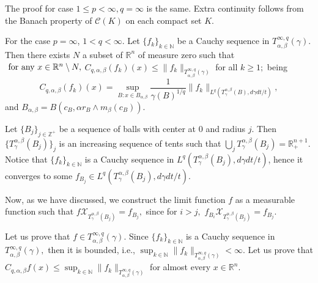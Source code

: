 \documentclass[leqno,11pt]{amsart}
\theoremstyle{plain}
\theoremstyle{remark}
\begin{document}
{{{The proof for case $1\le p <\infty, q=\infty$ is the same. Extra continuity follows from the Banach property of $\mathscr{C}(K)$ on each compact set $K$.

 For the case $p=\infty$, $1< q <\infty.$ Let $\{f_k\}_{k\in {\mathbb N}}$ be a Cauchy sequence in $T^{\infty, q}_{\alpha, \beta}(\gamma).$ Then there exists $N$ a subset of $\mathbb{R}^n$ of measure zero such that $\hbox{ for any } x\in \mathbb{R}^n\setminus N,$
$C_{q,\alpha, \beta}(f_k)(x)\le \|f_k\|_{T^{\infty, q}_{\alpha, \beta}(\gamma)}$ for all $k\ge 1;$ being $$C_{q,\alpha, \beta}(f_k)(x)=\sup_{B: x\in B_{\alpha, \beta}}\frac{1}{\gamma(B)^{1/q}}\|f_k\|_{L^q(T^{\alpha, \beta}_\gamma(B),d\gamma dt/t)},$$ and $B_{\alpha, \beta}=B(c_B, \alpha r_B\wedge m_\beta (c_B)).$

Let $\{B_j\}_{j\in {\mathbb Z}^+}$ be a sequence of balls with center at $0$ and radius $j.$ Then $\{T^{\alpha,\beta}_\gamma(B_j)\}_j$ is an increasing sequence of tents such that $\bigcup_j T^{\alpha,\beta}_\gamma(B_j)=\mathbb{R}^{n+1}_+.$ Notice that $\{f_k\}_{k\in {\mathbb N}}$ is a Cauchy sequence in $L^q\left(T^{\alpha, \beta}_\gamma(B_j), d\gamma dt/t\right)$, hence it converges to some $f_{B_j} \in L^q\left(T^{\alpha, \beta}_\gamma(B_j), d\gamma dt/t\right)$.  

Now, as we have discussed, we construct the limit function $f$ as a measurable function such that $f\mathcal{X}_{T^{\alpha,\beta}_\gamma (B_j)}=f_{B_j},$ since for $i>j,$ $f_{B_i}\mathcal{X}_{T^{\alpha,\beta}_\gamma(B_j)}=f_{B_j}.$


 
Let us prove that $f\in T_{\alpha, \beta}^{\infty, q}(\gamma).$ Since $\{f_k\}_{k\in {\mathbb N}}$ is a Cauchy sequence in $T^{\infty, q}_{\alpha, \beta}(\gamma),$ then it is bounded, i.e., $\sup_{k\in {\mathbb N}}\|f_k\|_{T^{\infty, q}_{\alpha, \beta}(\gamma)}<\infty.$
 Let us prove that $C_{q,\alpha, \beta}f(x)\le \sup_{k\in {\mathbb N}}\|f_k\|_{T^{\infty, q}_{\alpha, \beta}(\gamma)}$ for almost every $x\in \mathbb{R}^n.$ 
 
}}}
\end{document}
